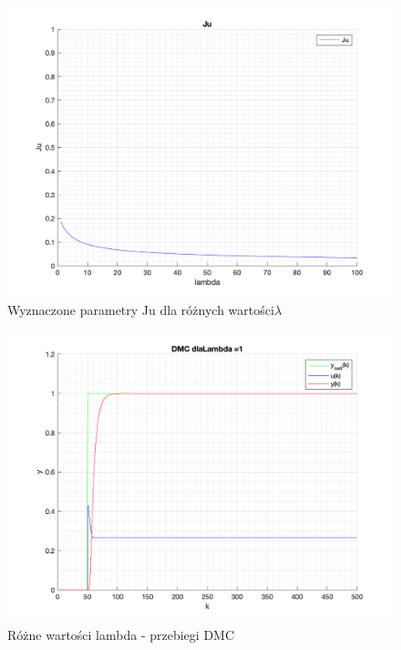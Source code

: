 \documentclass[a4paper, 11pt]{article}
\begin{document}
\begin{enumerate}
 \begin{figure} [H]
\centering
 \includegraphics[width=\linewidth]{./ModelsP4_J/Julambda.png} 
 \caption[Wyznaczone parametry Ju dla różnych wartości \lambda]
{Wyznaczone parametry Ju dla różnych wartości\( \lambda\)}
 \end{figure}
 
\begin{figure} [H]
\centering
 \includegraphics[width=\linewidth]{./ModelsP4_lambda/P4_DMC_lambda_1_png.png} 
 \caption[Różne wartości lambda - przebiegi DMC]
{Różne wartości lambda - przebiegi DMC}
 \end{figure}
 

\end{enumerate}
\end{document}
